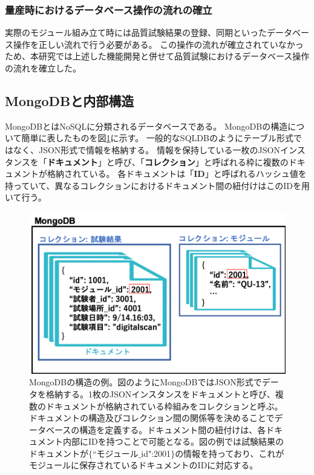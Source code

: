 \subsubsection{量産時におけるデータベース操作の流れの確立}
実際のモジュール組み立て時には品質試験結果の登録、同期といったデータベース操作を正しい流れで行う必要がある。
この操作の流れが確立されていなかっため、本研究では上述した機能開発と併せて品質試験におけるデータベース操作の流れを確立した。

\clearpage
\subsection{MongoDBと内部構造\cite{4-2}}
MongoDBとはNoSQLに分類されるデータベースである。
MongoDBの構造について簡単に表したものを図\ref{mongodb_schema}に示す。
一般的なSQLDBのようにテーブル形式ではなく、JSON形式で情報を格納する。
情報を保持している一枚のJSONインスタンスを「\textbf{ドキュメント}」と呼び、「\textbf{コレクション}」と呼ばれる枠に複数のドキュメントが格納されている。
各ドキュメントは「\textbf{ID}」と呼ばれるハッシュ値を持っていて、異なるコレクションにおけるドキュメント間の紐付けはこのIDを用いて行う。

\begin{figure}[bpt]\centering
\includegraphics[width=12cm]{./mongodb_schema.png}
\caption[MongoDBの構造の例\cite{4-2}]{MongoDBの構造の例\cite{4-2}。図のようにMongoDBではJSON形式でデータを格納する。1枚のJSONインスタンスをドキュメントと呼び、複数のドキュメントが格納されている枠組みをコレクションと呼ぶ。ドキュメントの構造及びコレクション間の関係等を決めることでデータベースの構造を定義する。ドキュメント間の紐付けは、各ドキュメント内部にIDを持つことで可能となる。図の例では試験結果のドキュメントが$\{$``モジュール$\_$id":2001$\}$の情報を持っており、これがモジュールに保存されているドキュメントのIDに対応する。}
\label{mongodb_schema}
\end{figure}


